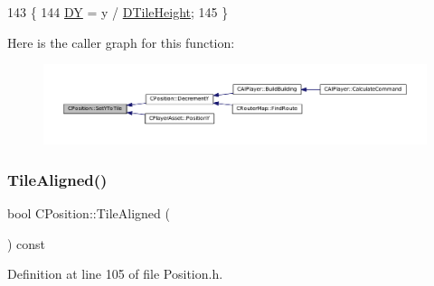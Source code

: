 \begin{DoxyCode}
143                                \{
144     \hyperlink{classCPosition_a84139c9e8eb547e7cf3cb851739943a4}{DY} = y / \hyperlink{classCPosition_a202ebb83e86df75cfb76cf1241ba817c}{DTileHeight};
145 \}
\end{DoxyCode}
Here is the caller graph for this function\+:\nopagebreak
\begin{figure}[H]
\begin{center}
\leavevmode
\includegraphics[width=350pt]{classCPosition_a5805485f623398197ac595a5d389f691_icgraph}
\end{center}
\end{figure}
\hypertarget{classCPosition_abe4ef039d9bbf51cd542167b5a0cd88e}{}\label{classCPosition_abe4ef039d9bbf51cd542167b5a0cd88e} 
\subsubsection{\texorpdfstring{Tile\+Aligned()}{TileAligned()}}
{\footnotesize\ttfamily bool C\+Position\+::\+Tile\+Aligned (\begin{DoxyParamCaption}{ }\end{DoxyParamCaption}) const\hspace{0.3cm}{\ttfamily [inline]}}



Definition at line 105 of file Position.\+h.


